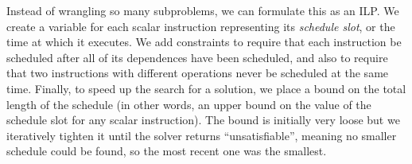 Instead of wrangling so many subproblems, we can formulate this as an ILP.
We create a variable for each scalar instruction representing its {\em schedule slot}, or the time at which it executes.
We add constraints to require that each instruction be scheduled after all of its dependences have been scheduled, and also to require that two instructions with different operations never be scheduled at the same time. 
Finally, to speed up the search for a solution, we place a bound on the total length of the schedule (in other words, an upper bound on the value of the schedule slot for any scalar instruction).
The bound is initially very loose but we iteratively tighten it until the solver returns ``unsatisfiable'', meaning no smaller schedule could be found, so the most recent one was the smallest.

